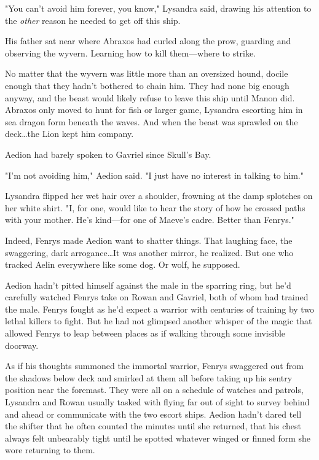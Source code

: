 "You can't avoid him forever, you know," Lysandra said, drawing his attention to the \emph{other} reason he needed to get off this ship.

His father sat near where Abraxos had curled along the prow, guarding and observing the wyvern.
Learning how to kill them---where to strike.

No matter that the wyvern was little more than an oversized hound, docile enough that they hadn't bothered to chain him.
They had none big enough anyway, and the beast would likely refuse to leave this ship until Manon did.
Abraxos only moved to hunt for fish or larger game, Lysandra escorting him in sea dragon form beneath the waves.
And when the beast was sprawled on the deck\ldots the Lion kept him company.

Aedion had barely spoken to Gavriel since Skull's Bay.

"I'm not avoiding him," Aedion said.
"I just have no interest in talking to him."

Lysandra flipped her wet hair over a shoulder, frowning at the damp splotches on her white shirt.
"I, for one, would like to hear the story of how he crossed paths with your mother.
He's kind---for one of Maeve's cadre.
Better than Fenrys."

Indeed, Fenrys made Aedion want to shatter things.
That laughing face, the swaggering, dark arrogance\ldots It was another mirror, he realized.
But one who tracked Aelin everywhere like some dog.
Or wolf, he supposed.

Aedion hadn't pitted himself against the male in the sparring ring, but he'd carefully watched Fenrys take on Rowan and Gavriel, both of whom had trained the male.
Fenrys fought as he'd expect a warrior with centuries of training by two lethal killers to fight.
But he had not glimpsed another whisper of the magic that allowed Fenrys to leap between places as if walking through some invisible doorway.

As if his thoughts summoned the immortal warrior, Fenrys swaggered out from the shadows below deck and smirked at them all before taking up his sentry position near the foremast.
They were all on a schedule of watches and patrols, Lysandra and Rowan usually tasked with flying far out of sight to survey behind and ahead or communicate with the two escort ships.
Aedion hadn't dared tell the shifter that he often counted the minutes until she returned, that his chest always felt unbearably tight until he spotted whatever winged or finned form she wore returning to them.

